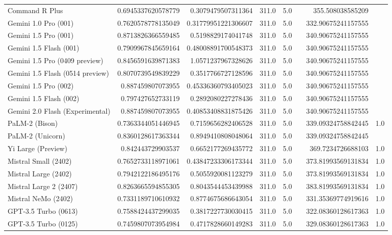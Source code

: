 \begin{table}[htp]
{\begin{tabular}{lrrrrrrr}
Command R Plus & 0.6945337620578779 & 0.3079479507311364 & 311.0 & 5.0 &  & 355.508038585209 &  \\
Gemini 1.0 Pro (001) & 0.7620578778135049 & 0.31779951221306607 & 311.0 & 5.0 &  & 332.90675241157555 &  \\
Gemini 1.5 Pro (001) & 0.8713826366559485 & 0.5198829174041748 & 311.0 & 5.0 &  & 340.90675241157555 &  \\
Gemini 1.5 Flash (001) & 0.7909967845659164 & 0.48008891700548373 & 311.0 & 5.0 &  & 340.90675241157555 &  \\
Gemini 1.5 Pro (0409 preview) & 0.8456591639871383 & 1.0571237967328626 & 311.0 & 5.0 &  & 340.90675241157555 &  \\
Gemini 1.5 Flash (0514 preview) & 0.8070739549839229 & 0.3517766727128596 & 311.0 & 5.0 &  & 340.90675241157555 &  \\
Gemini 1.5 Pro (002) & 0.887459807073955 & 0.45336360793405023 & 311.0 & 5.0 &  & 340.90675241157555 &  \\
Gemini 1.5 Flash (002) & 0.797427652733119 & 0.2892080227278436 & 311.0 & 5.0 &  & 340.90675241157555 &  \\
Gemini 2.0 Flash (Experimental) & 0.887459807073955 & 0.40853408831875426 & 311.0 & 5.0 &  & 340.90675241157555 &  \\
PaLM-2 (Bison) & 0.7363344051446945 & 0.7159656282406528 & 311.0 & 5.0 &  & 339.09324758842445 & 1.0 \\
PaLM-2 (Unicorn) & 0.8360128617363344 & 0.8949410808048064 & 311.0 & 5.0 &  & 339.09324758842445 &  \\
Yi Large (Preview) & 0.842443729903537 & 0.6652177269435772 & 311.0 & 5.0 &  & 369.7234726688103 & 1.0 \\
Mistral Small (2402) & 0.7652733118971061 & 0.43847233306173344 & 311.0 & 5.0 &  & 373.81993569131834 & 1.0 \\
Mistral Large (2402) & 0.7942122186495176 & 0.5055920081123279 & 311.0 & 5.0 &  & 373.81993569131834 & 1.0 \\
Mistral Large 2 (2407) & 0.8263665594855305 & 0.8043544453439988 & 311.0 & 5.0 &  & 383.81993569131834 & 1.0 \\
Mistral NeMo (2402) & 0.7331189710610932 & 0.8774675686643054 & 311.0 & 5.0 &  & 331.35369774919616 & 1.0 \\
GPT-3.5 Turbo (0613) & 0.7588424437299035 & 0.3817227730030415 & 311.0 & 5.0 &  & 322.08360128617363 & 1.0 \\
GPT-3.5 Turbo (0125) & 0.7459807073954984 & 0.4717828660149283 & 311.0 & 5.0 &  & 329.08360128617363 & 1.0 \\

\end{tabular}}
\end{table}
